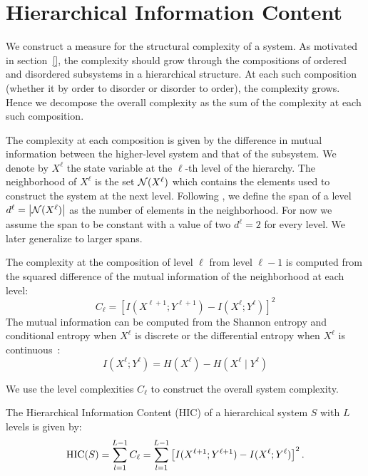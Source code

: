 \section{Hierarchical Information Content}
\label{sec:hic}

We construct a measure for the structural complexity of a system. As motivated
in section~\ref{}, the complexity should grow through the compositions of
ordered and disordered subsystems in a hierarchical structure. At each such
composition (whether it by order to disorder or disorder to order), the
complexity grows. Hence we decompose the overall complexity as the sum of the
complexity at each such composition.

The complexity at each composition is given by the difference in mutual
information between the higher-level system and that of the subsystem. We
denote by $X^{\ell}$ the state variable at the $\ell$-th level of the
hierarchy. The neighborhood of $X^\ell$ is the set $\mathcal{N}(X^\ell)$ which
contains the elements used to construct the system at the next level. Following
\citet{simon1991architecture}, we define the span of a level $d^\ell =
\left|\mathcal{N}(X^\ell)\right|$ as the number of elements in the neighborhood. For
now we assume the span to be constant with a value of two $d^\ell = 2$ for
every level. We later generalize to larger spans.

The complexity at the composition of level $\ell$ from level $\ell -1$ is
computed from the squared difference of the mutual information of the
neighborhood at each level:
\begin{equation}
  C_\ell = \left[ I(X^{\ell+1}; Y^{\ell+1}) - I(X^\ell; Y^\ell) \right]^2
\end{equation}
The mutual information can be computed from the Shannon entropy and conditional
entropy when $X^\ell$ is discrete or the differential entropy when $X^\ell$ is
continuous~\citep{cover1999elements}:
\begin{equation}
\label{eq:mutual_information}
I(X^\ell; Y^\ell) = H(X^\ell) - H(X^\ell \mid Y^\ell)
\end{equation}

We use the level complexities $C_\ell$ to construct the overall system complexity.
\begin{definition}
\label{def:hic}
  The Hierarchical Information Content (HIC) of a hierarchical system $S$ with
  $L$ levels is given by:
  \begin{equation}
    \label{eq:hic}
    \textup{HIC}(S) = \sum_{l=1}^{L-1} C_\ell = \sum_{l=1}^{L-1} \left[ I(X^{\ell+1}; Y^{\ell+1}) - I(X^\ell; Y^\ell) \right]^2.
  \end{equation}
\end{definition}

